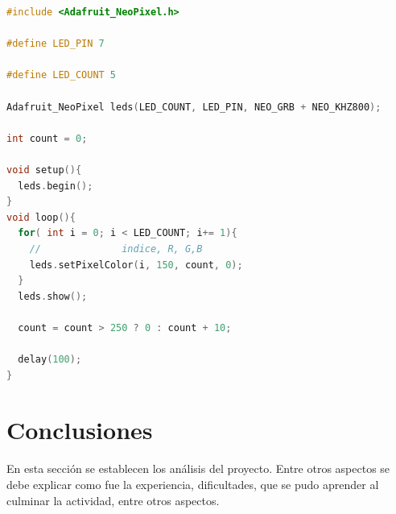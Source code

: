 \documentclass{article}
\begin{document}
\begin{lstlisting}[language=C++, caption=Ejemplo código Arduino]
#include <Adafruit_NeoPixel.h>

#define LED_PIN 7

#define LED_COUNT 5

Adafruit_NeoPixel leds(LED_COUNT, LED_PIN, NEO_GRB + NEO_KHZ800);

int count = 0;

void setup(){
  leds.begin();  
}
void loop(){
  for( int i = 0; i < LED_COUNT; i+= 1){
    //              indice, R, G,B
    leds.setPixelColor(i, 150, count, 0);
  }
  leds.show();

  count = count > 250 ? 0 : count + 10;
  
  delay(100);
}

\end{lstlisting}

\section{Conclusiones} \label{conclusiones}
En esta sección se establecen los análisis del proyecto. Entre otros aspectos se debe explicar como fue la experiencia, dificultades, que se pudo aprender al culminar la actividad, entre otros aspectos.



\end{document}
